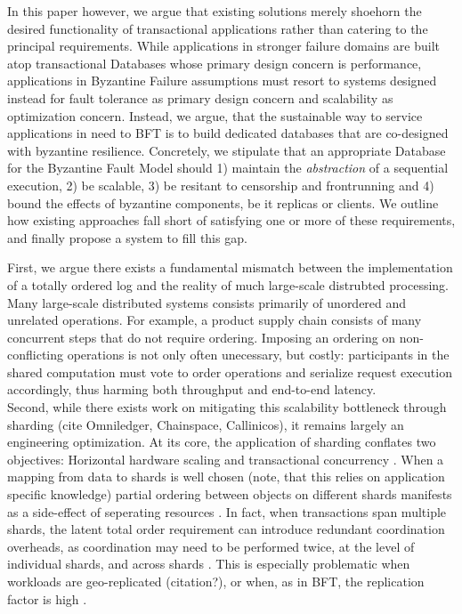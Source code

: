 In this paper however, we argue that existing solutions merely shoehorn the desired functionality of transactional applications rather than catering to the principal requirements. 
While applications in stronger failure domains  are built atop transactional Databases whose primary design concern is performance, applications in Byzantine Failure assumptions must resort to systems designed instead for fault tolerance as primary design concern and scalability as optimization concern. Instead, we argue, that the sustainable way to service applications in need to BFT is to build dedicated databases that are co-designed with byzantine resilience. 
Concretely, we stipulate that an appropriate Database for the Byzantine Fault Model should 1) maintain the \textit{abstraction} of a sequential execution, 2) be scalable, 3) be resitant to censorship and frontrunning and 4) bound the effects of byzantine components, be it replicas or clients.
We outline how existing approaches fall short of satisfying one or more of these requirements, and finally propose a system to fill this gap.

\iffalse
{}
First, we argue there exists a fundamental mismatch between the implementation of a totally ordered log and the reality of much large-scale distrubted processing. Many large-scale distributed systems consists primarily of unordered and unrelated operations. For example, a product supply chain consists of many concurrent steps that do not require ordering. Imposing an ordering on non-conflicting operations is not only often unecessary, but costly: participants in the shared computation must vote to order operations and serialize request execution accordingly, thus harming both throughput and end-to-end latency. \\

Second, while there exists work on mitigating this scalability bottleneck through sharding (cite Omniledger, Chainspace, Callinicos), it remains largely an engineering optimization. At its core, the application of sharding conflates two objectives: Horizontal hardware scaling and transactional concurrency . When a mapping from data to shards is well chosen (note, that this relies on application specific knowledge) partial ordering between objects on different shards manifests as a side-effect of seperating resources . In fact, when transactions span multiple shards, the latent total order requirement can introduce redundant coordination overheads, as coordination may need to be performed twice, at the level of individual shards, and across shards \cite{zhang2016operation}. This is especially problematic when workloads are geo-replicated (citation?), or when, as in BFT, the replication factor is high . \\

